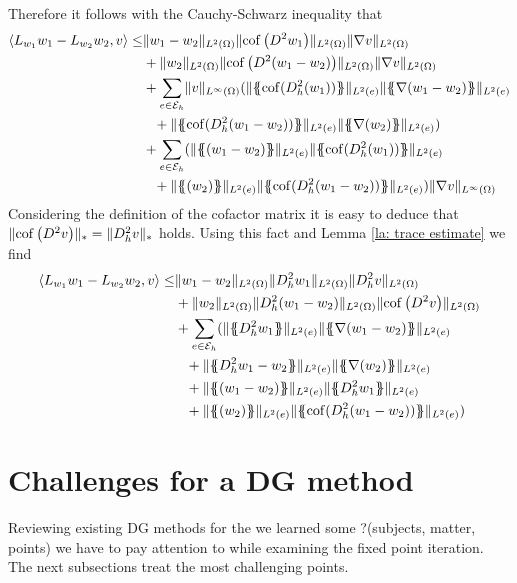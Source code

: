 Therefore it follows with the Cauchy-Schwarz inequality that
\begin{align}
\bilin{L_{w_1}w_1-L_{w_2}w_2} v \leq &  \LTwonorm{w_1-w_2} \LTwonorm{\cofHess{w_1}} \LTwonorm{\nabla v} \nonumber\\
			&+ \LTwonorm{w_2} \LTwonorm{\cofHess{(w_1-w_2)}} \LTwonorm{\nabla{v}} \nonumber \\
		&+ \sum_{e \in \edges} 
			\norm{v}_{L^\infty(\Omega)}( %
				\LTwonormE{ \average{ \cof(D_h^2 (w_1))}} \LTwonormE{ \average{\nabla (w_1-w_2)}} \nonumber\\
			  &\phantom++\LTwonormE{ \average{ \cof(D_h^2 (w_1-w_2))}} \LTwonormE{ \average{\nabla (w_2)}} 
			) \nonumber \\%
		&+ \sum_{e \in \edges} 
			( %
				\LTwonormE{ \average{(w_1-w_2)}} \LTwonormE{ \average{ \cof(D_h^2 (w_1))}} \nonumber\\
				&\phantom++\LTwonormE{ \average{(w_2)}} \LTwonormE{ \average{ \cof(D_h^2 (w_1-w_2))}} 
		) \norm{\nabla v}_{L^\infty(\Omega)}%
\end{align}
Considering the definition of the cofactor matrix it is easy to deduce that $\lVert \operatorname{cof} \left( D^2 v \right) \rVert_* =\lVert D^2_h{v} \rVert_*$ holds.
Using this fact and Lemma \ref{la: trace estimate} we find
\begin{align}
\bilin{L_{w_1}w_1-L_{w_2}w_2} v \leq & %
\LTwonorm{w_1-w_2} \LTwonorm{\hess{w_1}} \LTwonorm{\hess{v}} \nonumber\\
&+ \LTwonorm{w_2} \LTwonorm{\hess{(w_1-w_2)}} \LTwonorm{\cofHess{v}} \nonumber \\
	&+ \sum_{e \in \edges} (
		\LTwonormE{ \average{ \hess{w_1 }}} \LTwonormE{ \average{\nabla (w_1-w_2)}} \nonumber\\
		&\phantom+ +\LTwonormE{ \average{ \hess{w_1-w_2}}} \LTwonormE{ \average{\nabla (w_2)}}  \nonumber \\%
		&\phantom+ +\LTwonormE{ \average{(w_1-w_2)}} \LTwonormE{ \average{ \hess{w_1}}} \nonumber\\
		&\phantom+ +\LTwonormE{ \average{(w_2)}} \LTwonormE{ \average{ \cof(D_h^2 (w_1-w_2))}} 
	)
\end{align}


\section{Challenges for a \MA DG method}
Reviewing existing DG methods for the \MA we learned some ?(subjects, matter, points) we have to pay attention to  while examining the fixed point iteration. The next subsections treat the most challenging points.

